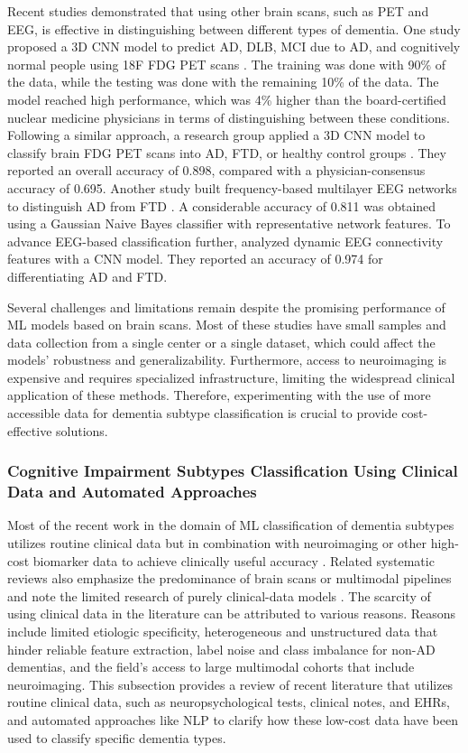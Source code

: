 Recent studies demonstrated that using other brain scans, such as PET and EEG, is effective in distinguishing between different types of dementia. One study proposed a 3D CNN model to predict AD, DLB, MCI due to AD, and cognitively normal people using 18F FDG PET scans \cite{Etminani20213D}. The training was done with 90\% of the data, while the testing was done with the remaining 10\% of the data. The model reached high performance, which was 4\% higher than the board-certified nuclear medicine physicians in terms of distinguishing between these conditions. Following a similar approach, a research group applied a 3D CNN model to classify brain FDG PET scans into AD, FTD, or healthy control groups \cite{Rogeau20243D}. They reported an overall accuracy of 0.898, compared with a physician-consensus accuracy of 0.695. Another study built frequency-based multilayer EEG networks to distinguish AD from FTD \cite{Si2023Differentiating}. A considerable accuracy of 0.811 was obtained using a Gaussian Naive Bayes classifier with representative network features. To advance EEG-based classification further,  analyzed dynamic EEG connectivity features with a CNN model. They reported an accuracy of 0.974 for differentiating AD and FTD.

Several challenges and limitations remain despite the promising performance of ML models based on brain scans. Most of these studies have small samples and data collection from a single center or a single dataset, which could affect the models' robustness and generalizability. Furthermore, access to neuroimaging is expensive and requires specialized infrastructure, limiting the widespread clinical application of these methods. Therefore, experimenting with the use of more accessible data for dementia subtype classification is crucial to provide cost-effective solutions.

\subsubsection{Cognitive Impairment Subtypes Classification Using Clinical Data and Automated Approaches}
Most of the recent work in the domain of ML classification of dementia subtypes utilizes routine clinical data but in combination with neuroimaging or other high-cost biomarker data to achieve clinically useful accuracy \cite{Silvia2023Differential, Xue2024AI}. Related systematic reviews also emphasize the predominance of brain scans or multimodal pipelines and note the limited research of purely clinical-data models \cite{Wang2024Understanding}. The scarcity of using clinical data in the literature can be attributed to various reasons. Reasons include limited etiologic specificity, heterogeneous and unstructured data that hinder reliable feature extraction, label noise and class imbalance for non-AD dementias, and the field’s access to large multimodal cohorts that include neuroimaging. This subsection provides a review of recent literature that utilizes routine clinical data, such as neuropsychological tests, clinical notes, and EHRs, and automated approaches like NLP to clarify how these low-cost data have been used to classify specific dementia types.


